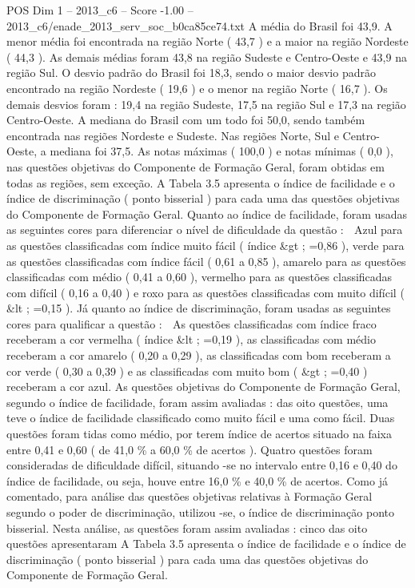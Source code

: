 \begin{textsample}{POS Dim 1 – 2013\_c6 – Score -1.00 – 2013\_c6/enade\_2013\_serv\_soc\_b0ca85ce74.txt}
A média do Brasil foi 43,9.
A menor média foi encontrada na região Norte ( 43,7 ) e a maior na região Nordeste ( 44,3 ).
As demais médias foram 43,8 na região Sudeste e Centro-Oeste e 43,9 na região Sul.
O desvio padrão do Brasil foi 18,3, sendo o maior desvio padrão encontrado na região Nordeste ( 19,6 ) e o menor na região Norte ( 16,7 ).
Os demais desvios foram : 19,4 na região Sudeste, 17,5 na região Sul e 17,3 na região Centro-Oeste.
A mediana do Brasil com um todo foi 50,0, sendo também encontrada nas regiões Nordeste e Sudeste.
Nas regiões Norte, Sul e Centro-Oeste, a mediana foi 37,5.
As notas máximas ( 100,0 ) e notas mínimas ( 0,0 ), nas questões objetivas do Componente de Formação Geral, foram obtidas em todas as regiões, sem exceção.
A Tabela 3.5 apresenta o índice de facilidade e o índice de discriminação ( ponto bisserial ) para cada uma das questões objetivas do Componente de Formação Geral.
Quanto ao índice de facilidade, foram usadas as seguintes cores para diferenciar o nível de dificuldade da questão :  Azul para as questões classificadas com índice muito fácil ( índice \&gt ; =0,86 ), verde para as questões classificadas com índice fácil ( 0,61 a 0,85 ), amarelo para as questões classificadas com médio ( 0,41 a 0,60 ), vermelho para as questões classificadas com difícil ( 0,16 a 0,40 ) e roxo para as questões classificadas com muito difícil ( \&lt ; =0,15 ).
Já quanto ao índice de discriminação, foram usadas as seguintes cores para qualificar a questão :  As questões classificadas com índice fraco receberam a cor vermelha ( índice \&lt ; =0,19 ), as classificadas com médio receberam a cor amarelo ( 0,20 a 0,29 ), as classificadas com bom receberam a cor verde ( 0,30 a 0,39 ) e as classificadas com muito bom ( \&gt ; =0,40 ) receberam a cor azul.
As questões objetivas do Componente de Formação Geral, segundo o índice de facilidade, foram assim avaliadas : das oito questões, uma teve o índice de facilidade classificado como muito fácil e uma como fácil.
Duas questões foram tidas como médio, por terem índice de acertos situado na faixa entre 0,41 e 0,60 ( de 41,0 \% a 60,0 \% de acertos ).
Quatro questões foram consideradas de dificuldade difícil, situando -se no intervalo entre 0,16 e 0,40 do índice de facilidade, ou seja, houve entre 16,0 \% e 40,0 \% de acertos.
Como já comentado, para análise das questões objetivas relativas à Formação Geral segundo o poder de discriminação, utilizou -se, o índice de discriminação ponto bisserial.
Nesta análise, as questões foram assim avaliadas : cinco das oito questões apresentaram A Tabela 3.5 apresenta o índice de facilidade e o índice de discriminação ( ponto bisserial ) para cada uma das questões objetivas do Componente de Formação Geral.

\end{textsample}
